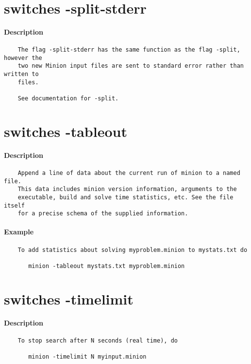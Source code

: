\section{switches -split-stderr}
\paragraph{Description}
{\footnotesize
\begin{verbatim}
    The flag -split-stderr has the same function as the flag -split, however the
    two new Minion input files are sent to standard error rather than written to
    files.

    See documentation for -split.
\end{verbatim}
}
\section{switches -tableout}
\paragraph{Description}
{\footnotesize
\begin{verbatim}
    Append a line of data about the current run of minion to a named file.
    This data includes minion version information, arguments to the
    executable, build and solve time statistics, etc. See the file itself
    for a precise schema of the supplied information.
\end{verbatim}
}
\paragraph{Example}
{\footnotesize
\begin{verbatim}
    To add statistics about solving myproblem.minion to mystats.txt do

       minion -tableout mystats.txt myproblem.minion
\end{verbatim}
}
\section{switches -timelimit}
\paragraph{Description}
{\footnotesize
\begin{verbatim}
    To stop search after N seconds (real time), do

       minion -timelimit N myinput.minion
\end{verbatim}
}
